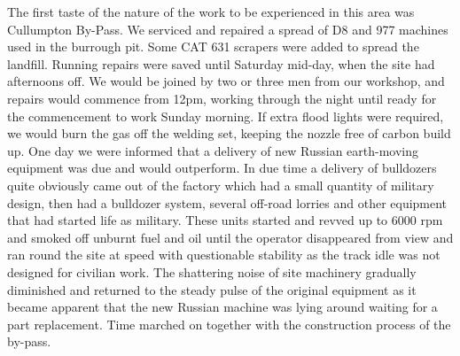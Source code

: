 The first taste of the nature of the work to be experienced in this area was
Cullumpton By-Pass. We serviced and repaired a spread of D8 and 977 machines
used in the burrough pit. Some CAT 631 scrapers were added to spread the
landfill. Running repairs were saved until Saturday mid-day, when the site had
afternoons off. We would be joined by two or three men from our workshop, and
repairs would commence from 12pm, working through the night until ready for
the commencement to work Sunday morning. If extra flood lights were required,
we would burn the gas off the welding set, keeping the nozzle free of carbon
build up. One day we were informed that a delivery of new Russian earth-moving
equipment was due and would outperform. In due time a delivery of bulldozers
quite obviously came out of the factory which had a small quantity of military
design, then had a bulldozer system, several off-road lorries and other
equipment that had started life as military. These units started and revved up
to 6000 rpm and smoked off unburnt fuel and oil until the operator disappeared
from view and ran round the site at speed with questionable stability as the
track idle was not designed for civilian work. The shattering noise of site
machinery gradually diminished and returned to the steady pulse of the original
equipment as it became apparent that the new Russian machine was lying around
waiting for a part replacement. Time marched on together with the construction
process of the by-pass.


